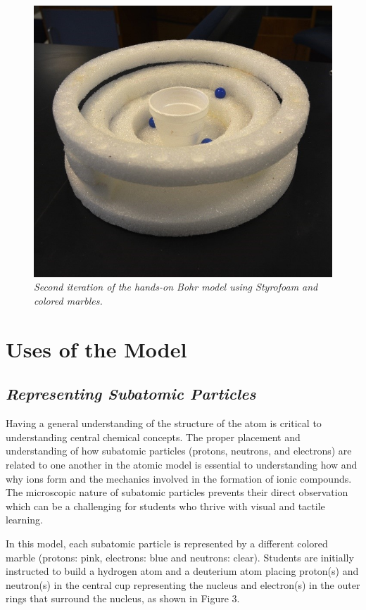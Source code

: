 \documentclass[11pt]{sig-alternate}
\begin{document}
\begin{large}
\begin{figure}[h!]
    \centering
    \includegraphics[width=\columnwidth]{figure 1_2.jpg}
    \captionsetup{font=large, labelfont=it}
    \caption{\textit{Second iteration of the hands-on Bohr model using Styrofoam and colored marbles.}}
    \label{Figure 1}
\end{figure}

\section*{Uses of the Model}
\subsection*{\textit{Representing Subatomic Particles }}
Having a general understanding of the structure of the atom is critical to understanding central chemical concepts. The proper placement and understanding of how subatomic particles (protons, neutrons, and electrons) are related to one another in the atomic model is essential to understanding how and why ions form and the mechanics involved in the formation of ionic compounds. The microscopic nature of subatomic particles prevents their direct observation which can be a challenging for students who thrive with visual and tactile learning.

In this model, each subatomic particle is represented by a different colored marble (protons: pink, electrons: blue and neutrons: clear). Students are initially instructed to build a hydrogen atom and a deuterium atom placing proton(s) and neutron(s) in the central cup representing the nucleus and electron(s) in the outer rings that surround the nucleus, as shown in Figure 3.


\end{large}
\end{document}
